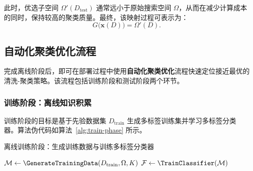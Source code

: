 \documentclass[8pt]{article} %
\numberwithin{equation}{section}
\begin{document}
此时，优选子空间 $\Omega'(D_{\text{test}})$ 通常远小于原始搜索空间 $\Omega$，从而在减少计算成本的同时，保持较高的聚类质量。最终，该映射过程可表示为：
\begin{equation}\label{eq:mapping-function}
G\bigl(\mathbf{x}(D)\bigr) = \Omega'(D).
\end{equation}


\subsection{自动化聚类优化流程}
\label{sec:autocluster-process}

完成离线阶段后，即可在部署过程中使用\textbf{自动化聚类优化}流程快速定位接近最优的清洗-聚类策略。该流程包括训练阶段和测试阶段两个环节。

\subsubsection{训练阶段：离线知识积累}
训练阶段的目标是基于先验数据集 \(D_{\text{train}}\) 生成多标签训练集并学习多标签分类器。算法伪代码如算法~\ref{alg:train-phase} 所示。

\begin{algorithm}[ht]
\caption{离线训练阶段：生成训练数据与训练多标签分类器}
\label{alg:train-phase}


$\mathcal{M} \leftarrow \GenerateTrainingData(D_{\text{train}}, \Omega, K)$\;
$\mathcal{F} \leftarrow \TrainClassifier(\mathcal{M})$\;

\bigskip


\end{algorithm}
\end{document}
